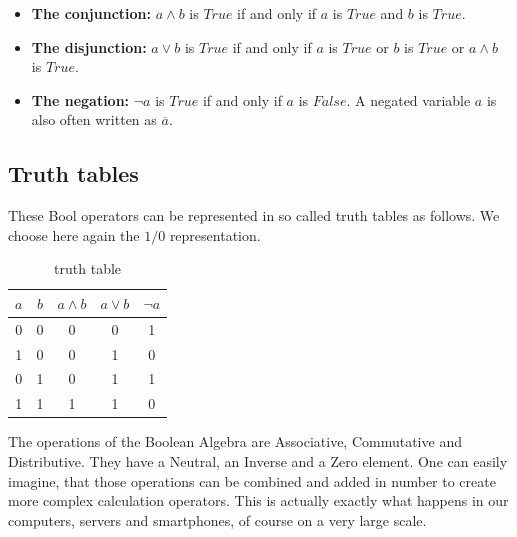 \documentclass[10pt,a4paper]{article}
\begin{document}
\begin{itemize}
 \item \textbf{The conjunction:} $a\land b$ is $True$ if and only if $a$ is $True$ and $b$ is $True$.\\
 \item \textbf{The disjunction:} $a\lor b$  is $True$ if and only if $a$ is $True$ or $b$ is $True$ or $a\wedge b$ is $True$.\\
 \item \textbf{The negation:}  $\neg a$ is $True$ if and only if $a$ is $False$. A negated variable $a$ is also often written as $\overline{a}$.
\end{itemize}

\subsection{Truth tables}
These Bool operators can be represented in so called truth tables as follows. We choose here again the $1 / 0$ representation.


\begin{table}[H]
\centering
\begin{tabular}{c|c|c|c|c}
\textbf{$a$} & \textbf{$b$} & \textbf{$a\land b$} & \textbf{$a\lor b$} & \textbf{$\neg a$} \\ \hline
0          & 0          & 0            & 0            & 1           \\
1          & 0          & 0            & 1            & 0           \\
0          & 1          & 0            & 1            & 1           \\
1          & 1          & 1            & 1            & 0          
\end{tabular}
\caption{truth table}
\label{tab:truth}
\end{table}

The operations of the Boolean Algebra are Associative, Commutative and Distributive. They have a Neutral, an Inverse and a Zero element. One can easily imagine, that those operations can be combined and added in number to create more complex calculation operators. This is actually exactly what happens in our computers, servers and smartphones, of course on a very large scale. 
\end{document}
